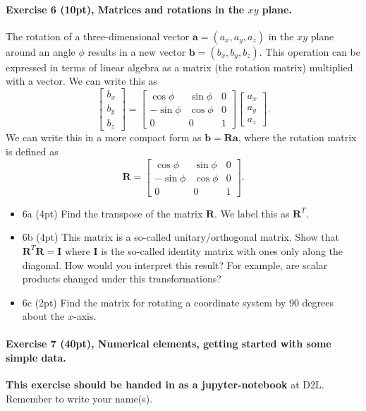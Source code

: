 \documentclass[%
oneside,                 %
final,                   %
10pt]{article}
\begin{document}
\paragraph{Exercise 6 (10pt), Matrices and rotations in the $xy$ plane.}
The rotation of a three-dimensional  vector $\bm{a}=(a_x,a_y,a_z)$ in the $xy$ plane around an angle $\phi$ results in a new vector $\bm{b}=(b_x,b_y,b_z)$.  This operation can be expressed in terms of linear algebra as a matrix (the rotation matrix) multiplied with a vector. We can write this as
\[
\begin{bmatrix} b_x \\ b_y \\ b_z \end{bmatrix} = \begin{bmatrix} \cos{\phi} & \sin{\phi} & 0 \\ -\sin{\phi} & \cos{\phi} & 0 \\ 0 & 0 & 1\end{bmatrix}\begin{bmatrix} a_x \\ a_y \\ a_z \end{bmatrix}.
\]
We can write this in a more compact form as $\bm{b} = \bm{R}\bm{a}$, where the rotation matrix is defined as
\[
\bm{R} = \begin{bmatrix} \cos{\phi} & \sin{\phi} & 0 \\ -\sin{\phi} & \cos{\phi} & 0 \\ 0 & 0 & 1\end{bmatrix}.
\]

\begin{itemize}
\item 6a (4pt) Find the transpose of the matrix $\bm{R}$. We label this as $\bm{R}^T$.

\item 6b (4pt)  This matrix is a so-called unitary/orthogonal matrix.  Show that $\bm{R}^T\bm{R}= \bm{I}$ where $\bm{I}$ is the so-called identity matrix with ones only along the diagonal. How would you interpret this result? For example, are scalar products changed under this transformations?

\item 6c (2pt) Find the matrix for rotating a coordinate system by $90$ degrees about the $x$-axis.
\end{itemize}

\noindent
\paragraph{Exercise 7 (40pt), Numerical elements, getting started with some simple data.}
\textbf{This exercise should be handed in as a jupyter-notebook} at D2L. Remember to write your name(s). 
\end{document}
